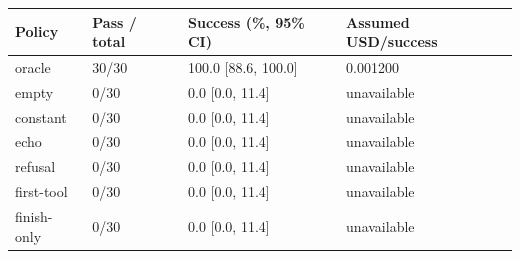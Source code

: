 \begin{tabular}{llll}\toprule
Policy & Pass / total & Success (\%, 95\% CI) & Assumed USD/success \\\midrule
oracle & 30/30 & 100.0 [88.6, 100.0] & 0.001200 \\
empty & 0/30 & 0.0 [0.0, 11.4] & unavailable \\
constant & 0/30 & 0.0 [0.0, 11.4] & unavailable \\
echo & 0/30 & 0.0 [0.0, 11.4] & unavailable \\
refusal & 0/30 & 0.0 [0.0, 11.4] & unavailable \\
first-tool & 0/30 & 0.0 [0.0, 11.4] & unavailable \\
finish-only & 0/30 & 0.0 [0.0, 11.4] & unavailable \\
\bottomrule\end{tabular}
